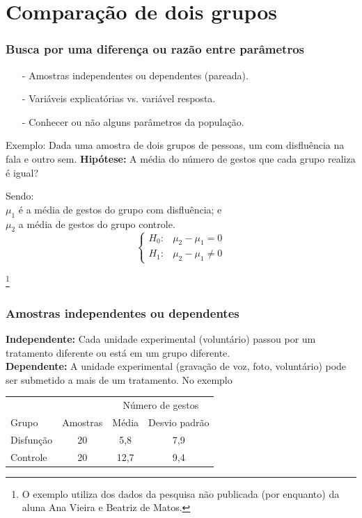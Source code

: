 \documentclass[graphics,14pt]{beamer}
\newcommand{\lfr}[1]{\let\thefootnote\relax\footnote{\hspace{0.6cm}\vspace{1.25cm} #1}}
\begin{document}
\section{Comparação de dois grupos}
\begin{frame}[t,fragile=singleslide]
\frametitle{Busca por uma diferença ou razão entre parâmetros}
\vspace{0.5cm}
\begin{itemize}
	\item[-] Amostras independentes ou dependentes (pareada).
	\item[-] Variáveis explicatórias vs. variável resposta.
	\item[-] Conhecer ou não alguns parâmetros da população.
\end{itemize}
\vspace{0.5cm}
Exemplo: Dada uma amostra de dois grupos de pessoas, um com disfluência na fala e outro sem. 
\textbf{Hipótese:} A média do número de gestos que cada grupo realiza é igual?

Sendo:\\
$\mu_1$ é a média de gestos do grupo com disfluência; e \\
$\mu_2$ a média de gestos do grupo controle. \\

\begin{equation*}
\left\{ \begin{array}{cl}
H_0: & \mu_2 - \mu_1 = 0 \\
H_1: & \mu_2 - \mu_1 \neq 0
\end{array}\right.
\end{equation*}

\lfr{O exemplo utiliza dos dados da pesquisa não publicada (por enquanto) da aluna Ana Vieira e Beatriz de Matos.}
\end{frame}
\begin{frame}[t,fragile=singleslide]
\frametitle{Amostras independentes ou dependentes}
	\textbf{Independente:} 	Cada unidade experimental (voluntário) passou por um tratamento diferente ou está em um grupo diferente.\\
	\textbf{Dependente:} A unidade experimental (gravação de voz, foto, voluntário) pode ser submetido a mais de um tratamento.
	\vspace{0.5cm}
	No exemplo
	\begin{table}[]
		\centering
		\begin{tabular}{lccc}
			&         & \multicolumn{2}{c}{Número de gestos} \\ \cline{3-4} 
			Grupo     & Amostras & Média         & Desvio padrão        \\ \hline
			Disfunção & 20       & 5,8           & 7,9                  \\
			Controle  & 20       & 12,7          & 9,4                 
		\end{tabular}
	\end{table}


\end{frame}
\end{document}

